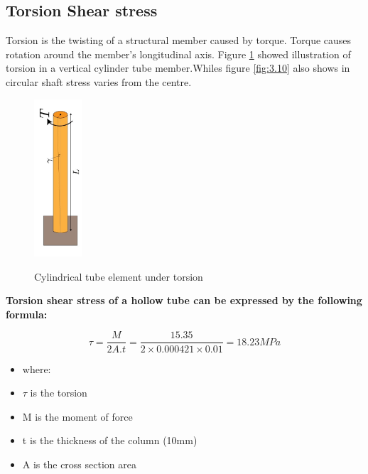 {\subsection{Torsion Shear stress}


Torsion is the twisting of a structural member caused by torque. Torque causes rotation around the member's longitudinal axis. Figure \ref{fig:3.9} showed illustration of torsion in a vertical cylinder tube member.Whiles figure \ref{fig:3.10} also shows in circular shaft stress varies from the centre.
 
 \begin{figure}[htp]
    \centering
    \includegraphics[width=0.7in]{Figures/torsion_shearstrain.jpg}
    \caption{Cylindrical tube element under torsion}
    \cite{boston_2022}
    \label{fig:3.9}
\end{figure}

\textbf{Torsion shear stress of a hollow tube can be expressed by the following formula:}

\begin{equation}
    \tau = \frac{M}{2A.t} = \frac{15.35}{2 \times 0.000421 \times 0.01} = 18.23MPa
\end{equation}



\begin{itemize}[label={}]
    \item where:
    \item \(\tau \) is the torsion
    \item M is the moment of force
    \item t is the thickness of the column (10mm)
    \item A is the cross section area
\end{itemize}


}
